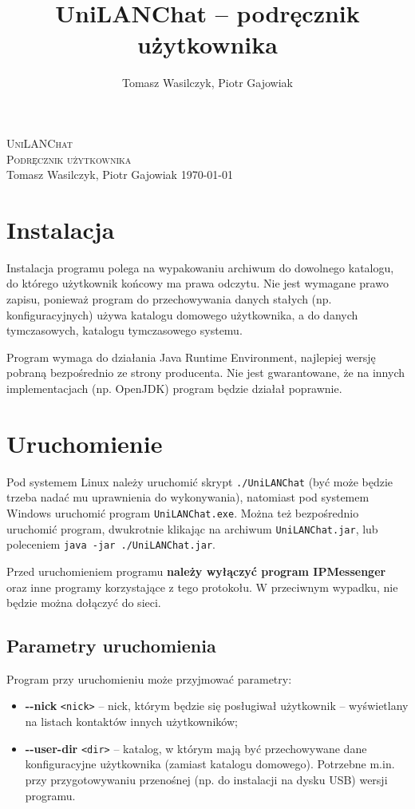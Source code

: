 \documentclass[11pt,leqno]{article}
\author{Tomasz Wasilczyk, Piotr Gajowiak}
\title{UniLANChat -- podręcznik użytkownika}
\begin{document}
\begin{titlepage}
\begin{center}
	\vspace*{6cm}
	\textsc{\LARGE UniLANChat}\\[0.25cm]
	\textsc{\Large Podręcznik użytkownika}\\[1cm]
	Tomasz Wasilczyk, Piotr Gajowiak
	\vfill
	\today
\end{center}
\end{titlepage}

\tableofcontents

\section{Instalacja}

Instalacja programu polega na wypakowaniu archiwum do dowolnego katalogu, do którego użytkownik
końcowy ma prawa odczytu. Nie jest wymagane prawo zapisu, ponieważ program do przechowywania danych
stałych (np. konfiguracyjnych) używa katalogu domowego użytkownika, a do danych tymczasowych,
katalogu tymczasowego systemu.

Program wymaga do działania Java Runtime Environment, najlepiej wersję pobraną bezpośrednio ze
strony producenta. Nie jest gwarantowane, że na innych implementacjach (np. OpenJDK) program będzie 
działał poprawnie.

\section{Uruchomienie}

Pod systemem Linux należy uruchomić skrypt \texttt{./UniLANChat} (być może będzie trzeba nadać mu
uprawnienia do wykonywania), natomiast pod systemem Windows uruchomić program \texttt{UniLANChat.exe}.
Można też bezpośrednio uruchomić program, dwukrotnie klikając na archiwum \texttt{UniLANChat.jar},
lub poleceniem \texttt{java -jar ./UniLANChat.jar}.

Przed uruchomieniem programu \textbf{należy wyłączyć program IPMessenger} oraz inne programy
korzystające z tego protokołu. W przeciwnym wypadku, nie będzie można dołączyć do sieci.

\subsection{Parametry uruchomienia}\label{sec:parameters}

Program przy uruchomieniu może przyjmować parametry:
\begin{itemize}
	\item \textbf{-\--nick} \texttt{<nick>} -- nick, którym będzie się posługiwał użytkownik --
	wyświetlany na listach kontaktów innych użytkowników;
	\item \textbf{-\--user-dir} \texttt{<dir>} -- katalog, w którym mają być przechowywane dane
	konfiguracyjne użytkownika (zamiast katalogu domowego). Potrzebne m.in. przy przygotowywaniu
	przenośnej (np. do instalacji na dysku USB) wersji programu.
\end{itemize}
\end{document}
